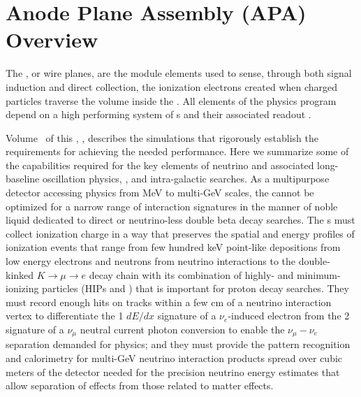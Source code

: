 \section{Anode Plane Assembly (APA) Overview}
\label{sec:fdsp-apa-intro}

The , or wire planes, are the   module elements used to sense, through both signal induction and direct collection, the ionization electrons created when charged particles traverse the  volume inside the .   All elements of the  physics program depend on a high performing system of s and their associated readout .  

Volume~\volnumberphysics{} of this , \voltitlephysics, %
describes the simulations that rigorously establish the requirements for achieving the needed performance.  Here we summarize some of the  capabilities required for the key elements of neutrino  and associated long-baseline oscillation physics, , and intra-galactic  searches.  As a multipurpose detector accessing physics from MeV to multi-GeV scales, the   cannot be optimized for a narrow range of interaction signatures in the manner of noble liquid  dedicated to direct  or neutrino-less double beta decay searches.  The s must collect ionization charge in a way that preserves the spatial and energy profiles of ionization events that range from few hundred keV point-like depositions from low energy electrons and neutrons from  neutrino interactions to the double-kinked $K\rightarrow\mu\rightarrow{e}$ decay chain with its combination of highly- and minimum-ionizing particles (HIPs and ) that is important for proton decay searches.  They must record enough hits on tracks within a few cm of a neutrino interaction vertex to differentiate the 1  $dE/dx$ signature of a $\nu_e$-induced electron from the 2  signature of a $\nu_\mu$ neutral current photon conversion to enable the $\nu_\mu-\nu_e$ separation demanded for  physics; and they must provide the pattern recognition and calorimetry for multi-GeV neutrino interaction products  spread over cubic meters of the detector needed for the precision neutrino energy estimates that allow separation of  effects from those related to matter effects. 
 
